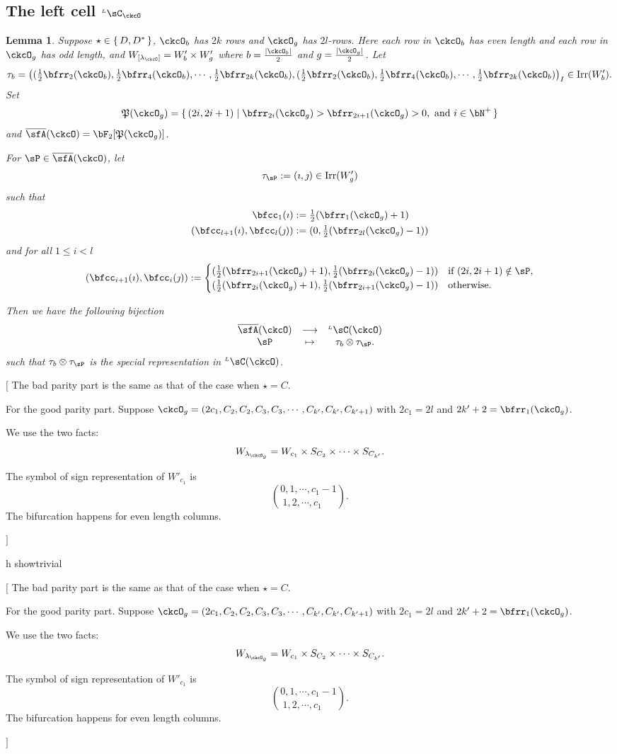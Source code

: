 \documentclass[12pt,a4paper]{amsart}
\newcommand{\trivial}[2][]{\if\relax\detokenize{#1}\relax
  {%
      \color{orange} \vspace{0em} $[$  #2 $]$
      \color{black}
  }
  \else
\ifx#1h
\ifcsname showtrivial\endcsname
{%
    \color{orange} \vspace{0em}  $[$ #2 $]$
    \color{black}
}
\fi
\else {\red Wrong argument!} \fi
\fi
}
\def\abs#1{\left|{#1}\right|}
\newcommand{\CQ}{{\mathcal {Q}}}
\numberwithin{equation}{section}
\newtheorem{lem}[thm]{Lemma}
\theoremstyle{remark}
\def\half{{\tfrac{1}{2}}}
\def\Irr{\mathrm{Irr}}
\def\lamckg{\lambda_{\ckcO_g}}
\def\WLamck{W_{[\lambda_{\ckcO}]}}
\def\LC{{}^{\scriptscriptstyle L}\sC}
\def\CQ{\overline{\sfA}}%
\def\CPP{\mathfrak{P}}
\begin{document}
\subsection{The left cell $\LC_{\ckcO}$}

\begin{lem}
  Suppose $\star \in \set{D, D^{*}}$, $\ckcO_{b}$ has $2k$ rows and $\ckcO_{g}$
  has $2l$-rows. Here each row in $\ckcO_{b}$ has even length and each row in
  $\ckcO_{g}$ has odd length, and $\WLamck = W'_{b}\times W'_{g}$ where
  $b= \frac{\abs{\ckcO_{b}}}{2}$ and $g = \frac{\abs{\ckcO_{g}}}{2}$. Let
  \[
    \tau_{b} = \left( (\half\bfrr_{2}(\ckcO_{b}), \half\bfrr_{4}(\ckcO_{b}),\cdots, \half\bfrr_{2k}(\ckcO_{b}), (\half\bfrr_{2}(\ckcO_{b}), \half\bfrr_{4}(\ckcO_{b}),\cdots, \half\bfrr_{2k}(\ckcO_{b}) \right)_{I}\in \Irr(W'_{b}).
  \]
  Set
  \[
    \CPP(\ckcO_{g}) = \set{(2i,2i+1)| \bfrr_{2i}(\ckcO_{g})> \bfrr_{2i+1}(\ckcO_{g})>0, \text{
        and } i\in \bN^{+}}
  \]
  and $\CQ(\ckcO)= \bF_{2}[\CPP(\ckcO_{g})]$.

  For $\sP \in \CQ(\ckcO)$, let
  \[
    \tau_{\sP} := (\imath,\jmath) \in \Irr(W'_{g})
  \]
  such that
  \[
    \begin{split}
      \bfcc_{1}(\imath)  &:= \half(\bfrr_{1}(\ckcO_{g})+1)\\
      (\bfcc_{l+1}(\imath), \bfcc_{l}(\jmath))  &:= (0,\half(\bfrr_{2l}(\ckcO_{g})-1))
    \end{split}
  \]
  and for all $1\leq i< l$
  \[
  (\bfcc_{i+1}(\imath), \bfcc_{i}(\jmath)):=
  \begin{cases}
    (\half (\bfrr_{2i+1}(\ckcO_{g})+1),
    \half (\bfrr_{2i}(\ckcO_{g})-1))
    & \text{if } (2i,2i+1)\notin \sP,\\
    (\half (\bfrr_{2i}(\ckcO_{g})+1),\half (\bfrr_{2i+1}(\ckcO_{g})-1)) & \text{otherwise.}
  \end{cases}
  \]

  Then we have the following bijection
  \[
    \begin{array}{ccc}
      \CQ(\ckcO) &\longrightarrow & \LC(\ckcO)\\
      \sP & \mapsto & \tau_{b}\otimes \tau_{\sP}.
    \end{array}
  \]
  such that $\tau_{b}\otimes \tau_{\sP}$ is the special representation in
  $\LC(\ckcO)$.
\end{lem}
\trivial{
  The bad parity part is the same as that of the case when $\star = C$.

  For the good parity part.
  Suppose
  $\ckcO_{g} = (2c_{1}, C_{2}, C_{2},C_{3},C_{3},\cdots, C_{k'},C_{k'},C_{k'+1})$ with
  $2c_{1}=2l$ and $2k'+2 = \bfrr_{1}(\ckcO_{g})$.

  We use the two facts:
  \[
    W_{\lamckg} = W_{c_{1}}\times S_{C_{2}}\times \cdots
    \times S_{C_{k'}}.
  \]

  The symbol of sign representation of $W'_{c_{1}}$ is
  \[
    \binom{0,1, \cdots, c_{1}-1}{1,2, \cdots, c_{1}\phantom{-1}}.
  \]
  The bifurcation happens for even length columns.

}
\end{document}
